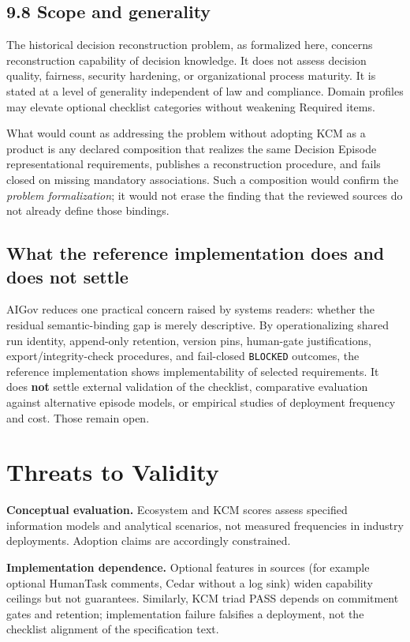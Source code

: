 \documentclass[11pt,a4paper]{article}
\begin{document}
\subsection{9.8 Scope and generality}

The historical decision reconstruction problem, as formalized here, concerns reconstruction capability of decision knowledge. It does not assess decision quality, fairness, security hardening, or organizational process maturity. It is stated at a level of generality independent of law and compliance. Domain profiles may elevate optional checklist categories without weakening Required items.


What would count as addressing the problem without adopting KCM as a product is any declared composition that realizes the same Decision Episode representational requirements, publishes a reconstruction procedure, and fails closed on missing mandatory associations. Such a composition would confirm the \emph{problem formalization}; it would not erase the finding that the reviewed sources do not already define those bindings.


\subsection{What the reference implementation does and does not settle}

AIGov reduces one practical concern raised by systems readers: whether the residual semantic-binding gap is merely descriptive. By operationalizing shared run identity, append-only retention, version pins, human-gate justifications, export/integrity-check procedures, and fail-closed \texttt{BLOCKED} outcomes, the reference implementation shows implementability of selected requirements. It does \textbf{not} settle external validation of the checklist, comparative evaluation against alternative episode models, or empirical studies of deployment frequency and cost. Those remain open.



\section{Threats to Validity}

\textbf{Conceptual evaluation.} Ecosystem and KCM scores assess specified information models and analytical scenarios, not measured frequencies in industry deployments. Adoption claims are accordingly constrained.


\textbf{Implementation dependence.} Optional features in sources (for example optional HumanTask comments, Cedar without a log sink) widen capability ceilings but not guarantees. Similarly, KCM triad PASS depends on commitment gates and retention; implementation failure falsifies a deployment, not the checklist alignment of the specification text.
\end{document}
